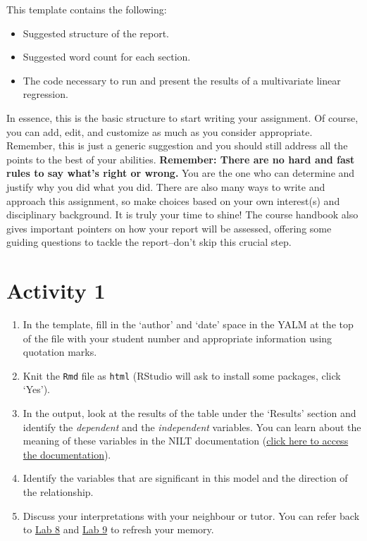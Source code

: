 \documentclass[
]{book}
\providecommand{\tightlist}{%
  \setlength{\itemsep}{0pt}\setlength{\parskip}{0pt}}
\begin{document}
This template contains the following:

\begin{itemize}
\tightlist
\item
  Suggested structure of the report.
\item
  Suggested word count for each section.
\item
  The code necessary to run and present the results of a multivariate linear regression.
\end{itemize}

In essence, this is the basic structure to start writing your assignment. Of course, you can add, edit, and customize as much as you consider appropriate. Remember, this is just a generic suggestion and you should still address all the points to the best of your abilities. \textbf{Remember: There are no hard and fast rules to say what's right or wrong.} You are the one who can determine and justify why you did what you did. There are also many ways to write and approach this assignment, so make choices based on your own interest(s) and disciplinary background. It is truly your time to shine! The course handbook also gives important pointers on how your report will be assessed, offering some guiding questions to tackle the report--don't skip this crucial step.

\hypertarget{activity-1-3}{%
\section{Activity 1}\label{activity-1-3}}

\begin{enumerate}
\def\labelenumi{\arabic{enumi}.}
\tightlist
\item
  In the template, fill in the `author' and `date' space in the YALM at the top of the file with your student number and appropriate information using quotation marks.
\item
  Knit the \texttt{Rmd} file as \texttt{html} (RStudio will ask to install some packages, click `Yes').
\item
  In the output, look at the results of the table under the `Results' section and identify the \emph{dependent} and the \emph{independent} variables. You can learn about the meaning of these variables in the NILT documentation (\href{https://www.ark.ac.uk/teaching/NILT2012TeachingResources.pdf}{click here to access the documentation}).
\item
  Identify the variables that are significant in this model and the direction of the relationship.
\item
  Discuss your interpretations with your neighbour or tutor. You can refer back to \protect\hyperlink{simple-lm}{Lab 8} and \protect\hyperlink{multi-lm}{Lab 9} to refresh your memory.
\end{enumerate}
\end{document}
